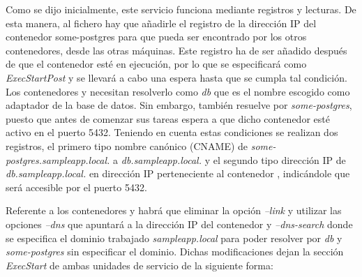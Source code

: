 Como se dijo inicialmente, este servicio funciona mediante registros y lecturas. De esta manera, al fichero  hay que añadirle el registro de la dirección IP del contenedor some-postgres para que pueda ser encontrado por los otros contenedores, desde las otras máquinas. Este registro ha de ser añadido después de que el contenedor esté en ejecución, por lo que se especificará como \textit{ExecStartPost} y se llevará a cabo una espera hasta que se cumpla tal condición. Los contenedores  y  necesitan resolverlo como \textit{db} que es el nombre escogido como adaptador de la base de datos. Sin embargo,  también resuelve por \textit{some-postgres}, puesto que antes de comenzar sus tareas espera a que dicho contenedor esté activo en el puerto 5432. Teniendo en cuenta estas condiciones se realizan dos registros, el primero tipo nombre canónico (CNAME) de \textit{some-postgres.sampleapp.local.} a \textit{db.sampleapp.local.} y el segundo tipo dirección IP de \textit{db.sampleapp.local.} en dirección IP perteneciente al contenedor , indicándole que será accesible por el puerto 5432.

\begin{codelisting}
\label{code:user-data-skydns-postgresql}
\end{codelisting}

Referente a los contenedores \kode{app-job} y  habrá que eliminar la opción \textit{--link} y utilizar las opciones \textit{--dns} que apuntará a la dirección IP del contenedor  y \textit{--dns-search} donde se especifica el dominio trabajado \textit{sampleapp.local} para poder resolver por \textit{db} y \textit{some-postgres} sin especificar el dominio. Dichas modificaciones dejan la sección \textit{ExecStart} de ambas unidades de servicio de la siguiente forma:

